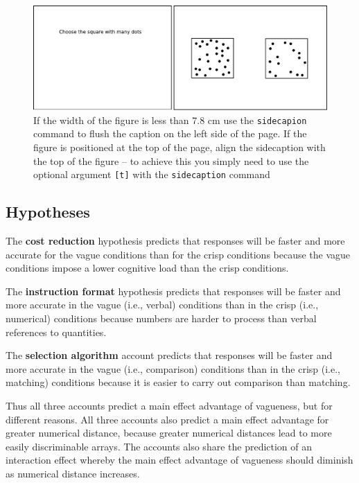 \documentclass[graybox,envcountchap,sectrefs%
,footinfo
]{svmono}
\begin{document}
\begin{figure}[b]
\sidecaption
\includegraphics[scale=.65]{images/stimuluse1}
\caption{If the width of the figure is less than 7.8 cm use the \texttt{sidecapion} command to flush the caption on the left side of the page. If the figure is positioned at the top of the page, align the sidecaption with the top of the figure -- to achieve this you simply need to use the optional argument \texttt{[t]} with the \texttt{sidecaption} command}
\label{stimuluse1}
\end{figure}

\subsection{Hypotheses}
The {\bf cost reduction} hypothesis predicts that responses will be faster and more accurate for the vague conditions than for the crisp conditions because the vague conditions impose a lower cognitive load than the crisp conditions. 

The {\bf instruction format} hypothesis predicts that responses will be faster and more accurate in the vague (i.e., verbal) conditions than in the crisp (i.e., numerical) conditions because numbers are harder to process than verbal references to quantities.

The {\bf selection algorithm} account predicts that responses will be faster and more accurate in the vague (i.e., comparison) conditions than in the crisp (i.e., matching) conditions because it is easier to carry out comparison than matching. 

Thus all three accounts predict a main effect advantage of vagueness, but for different reasons. All three accounts also predict a main effect advantage for greater numerical distance, because greater numerical distances lead to more easily discriminable arrays. The accounts also share the prediction of an interaction effect whereby the main effect advantage of vagueness should diminish as numerical distance increases.

\end{document}
